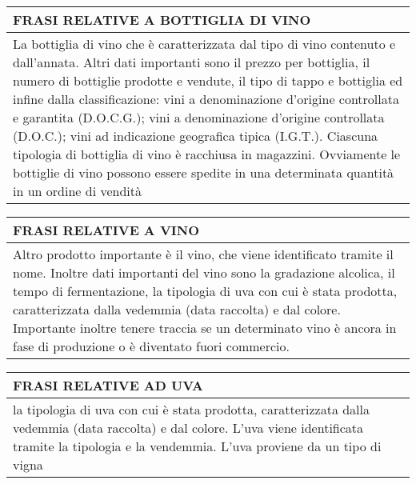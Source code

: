 \begin{center}
	\begin{tabular}{P{16cm}}
		\toprule
		 \textbf {\large {FRASI RELATIVE A BOTTIGLIA DI VINO}} \\
		\midrule
		La bottiglia di vino che è caratterizzata dal tipo di vino contenuto e dall'annata. Altri dati importanti sono il prezzo per bottiglia, il numero di bottiglie prodotte e vendute, il tipo di tappo e bottiglia ed infine dalla classificazione: vini a denominazione d'origine controllata e garantita (D.O.C.G.); vini a denominazione d'origine controllata (D.O.C.); vini ad indicazione geografica tipica (I.G.T.). Ciascuna tipologia di bottiglia di vino è racchiusa in magazzini. Ovviamente le bottiglie di vino possono essere spedite in una determinata quantità in un ordine di vendità\\
		\bottomrule
	\end{tabular}

	\vspace{0.5cm}
	
	\begin{tabular}{P{16cm}}
		\toprule
		 \textbf {\large {FRASI RELATIVE A VINO}} \\
		\midrule
		Altro prodotto importante è il vino, che viene identificato tramite il nome. Inoltre dati importanti del vino sono la gradazione alcolica, il tempo di fermentazione, la tipologia di uva con cui è stata prodotta, caratterizzata dalla vedemmia (data raccolta) e dal colore.  Importante inoltre tenere traccia se un determinato vino è ancora in fase di produzione o è diventato fuori commercio.\\
		\bottomrule
	\end{tabular}

	\vspace{0.5cm}
	
	\begin{tabular}{P{16cm}}
		\toprule
		 \textbf {\large {FRASI RELATIVE AD UVA}} \\
		\midrule
		la tipologia di uva con cui è stata prodotta, caratterizzata dalla vedemmia (data raccolta) e dal colore. L'uva viene identificata tramite la tipologia e la vendemmia. L'uva proviene da un tipo di vigna\\
		\bottomrule
	\end{tabular}

	\vspace{0.5cm}


\end{center}
